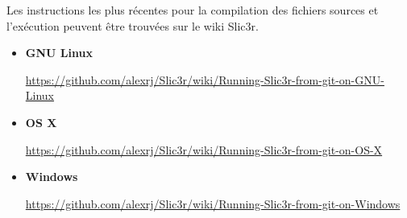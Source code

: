 Les instructions les plus r\'ecentes pour la compilation des fichiers sources et l'ex\'ecution peuvent \^etre trouv\'ees sur le wiki Slic3r.

\begin{itemize}
    \item \textbf{GNU Linux} \par\url{https://github.com/alexrj/Slic3r/wiki/Running-Slic3r-from-git-on-GNU-Linux}
    \item \textbf{OS X} \par\url{https://github.com/alexrj/Slic3r/wiki/Running-Slic3r-from-git-on-OS-X}
    \item \textbf{Windows} \par\url{https://github.com/alexrj/Slic3r/wiki/Running-Slic3r-from-git-on-Windows}

\end{itemize}
